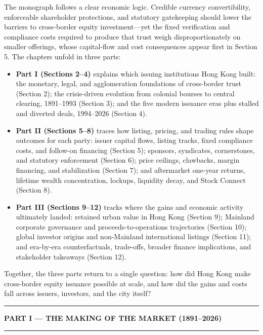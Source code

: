 \documentclass[11pt,letterpaper]{article}
\begin{document}
The monograph follows a clear economic logic. Credible currency convertibility, enforceable shareholder protections, and statutory gatekeeping should lower the barriers to cross-border equity investment—yet the fixed verification and compliance costs required to produce that trust weigh disproportionately on smaller offerings, whose capital-flow and cost consequences appear first in Section 5. The chapters unfold in three parts:

\begin{itemize}
\item \textbf{Part I (Sections 2–4)} explains which issuing institutions Hong Kong built: the monetary, legal, and agglomeration foundations of cross-border trust (Section 2); the crisis-driven evolution from colonial bourses to central clearing, 1891–1993 (Section 3); and the five modern issuance eras plus stalled and diverted deals, 1994–2026 (Section 4).
\item \textbf{Part II (Sections 5–8)} traces how listing, pricing, and trading rules shape outcomes for each party: issuer capital flows, listing tracks, fixed compliance costs, and follow-on financing (Section 5); sponsors, syndicates, cornerstones, and statutory enforcement (Section 6); price ceilings, clawbacks, margin financing, and stabilization (Section 7); and aftermarket one-year returns, lifetime wealth concentration, lockups, liquidity decay, and Stock Connect (Section 8).
\item \textbf{Part III (Sections 9–12)} tracks where the gains and economic activity ultimately landed: retained urban value in Hong Kong (Section 9); Mainland corporate governance and proceeds-to-operations trajectories (Section 10); global investor origins and non-Mainland international listings (Section 11); and era-by-era counterfactuals, trade-offs, broader finance implications, and stakeholder takeaways (Section 12).
\end{itemize}

Together, the three parts return to a single question: how did Hong Kong make cross-border equity issuance possible at scale, and how did the gains and costs fall across issuers, investors, and the city itself?

\par\vspace{16pt}
\noindent\rule{\linewidth}{0.85pt}\par\vspace{5pt}
{\centering\Large\bfseries\color{NavyAccent} \texorpdfstring{PART I — THE MAKING OF THE MARKET (1891–2026)}{PART I — THE MAKING OF THE MARKET (1891–2026)}\par}
\vspace{4pt}\noindent\rule{\linewidth}{0.85pt}\par\vspace{8pt}
\end{document}
